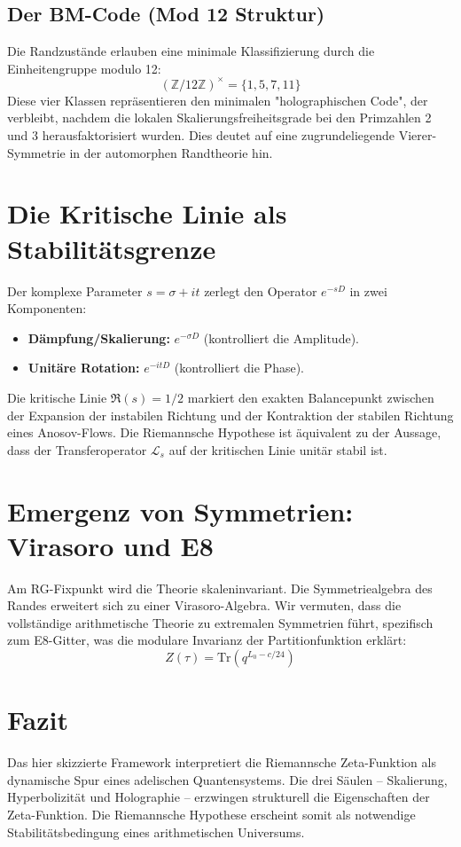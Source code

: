 \documentclass[11pt, a4paper]{article}
\begin{document}
	\subsection{Der BM-Code (Mod 12 Struktur)}
	Die Randzustände erlauben eine minimale Klassifizierung durch die Einheitengruppe modulo 12:
	\begin{equation}
		(\mathbb{Z}/12\mathbb{Z})^\times = \{1, 5, 7, 11\}
	\end{equation}
	Diese vier Klassen repräsentieren den minimalen "holographischen Code", der verbleibt, nachdem die lokalen Skalierungsfreiheitsgrade bei den Primzahlen 2 und 3 herausfaktorisiert wurden. Dies deutet auf eine zugrundeliegende Vierer-Symmetrie in der automorphen Randtheorie hin.
	
	\section{Die Kritische Linie als Stabilitätsgrenze}
	
	Der komplexe Parameter $s = \sigma + it$ zerlegt den Operator $e^{-sD}$ in zwei Komponenten:
	\begin{itemize}
		\item \textbf{Dämpfung/Skalierung:} $e^{-\sigma D}$ (kontrolliert die Amplitude).
		\item \textbf{Unitäre Rotation:} $e^{-itD}$ (kontrolliert die Phase).
	\end{itemize}
	Die kritische Linie $\Re(s) = 1/2$ markiert den exakten Balancepunkt zwischen der Expansion der instabilen Richtung und der Kontraktion der stabilen Richtung eines Anosov-Flows. Die Riemannsche Hypothese ist äquivalent zu der Aussage, dass der Transferoperator $\mathcal{L}_s$ auf der kritischen Linie unitär stabil ist.
	
	\section{Emergenz von Symmetrien: Virasoro und E8}
	
	Am RG-Fixpunkt wird die Theorie skaleninvariant. Die Symmetriealgebra des Randes erweitert sich zu einer Virasoro-Algebra. Wir vermuten, dass die vollständige arithmetische Theorie zu extremalen Symmetrien führt, spezifisch zum E8-Gitter, was die modulare Invarianz der Partitionfunktion erklärt:
	\begin{equation}
		Z(\tau) = \text{Tr}(q^{L_0 - c/24})
	\end{equation}
	
	\section{Fazit}
	
	Das hier skizzierte Framework interpretiert die Riemannsche Zeta-Funktion als dynamische Spur eines adelischen Quantensystems. Die drei Säulen – Skalierung, Hyperbolizität und Holographie – erzwingen strukturell die Eigenschaften der Zeta-Funktion. Die Riemannsche Hypothese erscheint somit als notwendige Stabilitätsbedingung eines arithmetischen Universums.
	
\end{document}
